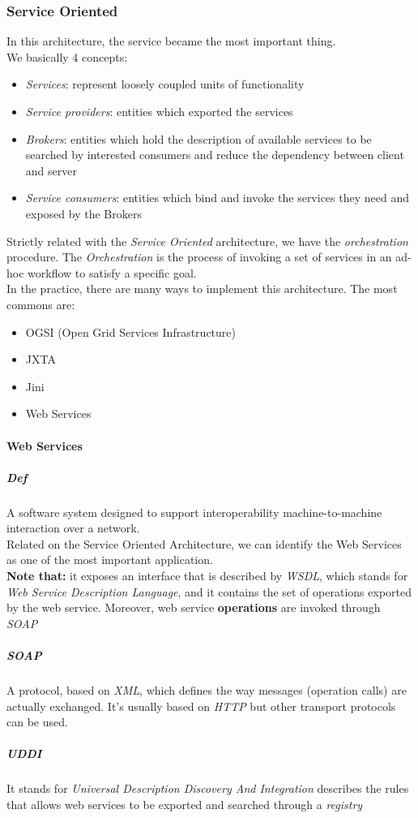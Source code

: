     \subsubsection{Service Oriented}
    In this architecture, the service became the most important thing.\\
    We basically 4 concepts:
    \begin{itemize}
        \item \textit{Services}: represent loosely coupled units of functionality
        \item \textit{Service providers}: entities which exported the services
        \item \textit{Brokers}: entities which hold the description of available 
                services to be searched by interested consumers and reduce the
                dependency between client and server
        \item \textit{Service consumers}: entities which bind and invoke the services
                they need and exposed by the Brokers
    \end{itemize}
    Strictly related with the \textit{Service Oriented} architecture, we have the \textit{orchestration} procedure. The \textit{Orchestration} is the process of invoking a set of services in an ad-hoc workflow to satisfy a specific goal.\\
    In the practice, there are many ways to implement this architecture.
    The most commons are:
    \begin{itemize}
        \item OGSI (Open Grid Services Infrastructure)
        \item JXTA
        \item Jini
        \item Web Services
    \end{itemize}
    
    \paragraph{Web Services}
    \subparagraph{Def}
    A software system designed to support interoperability machine-to-machine
    interaction over a network.\\
    
    Related on the Service Oriented Architecture, we can identify
    the Web Services as one of the most important application.\\
    
    \textbf{Note that:} it exposes an interface that is described by \textit{WSDL},
    which stands for \textit{Web Service Description Language}, and it
    contains the set of operations exported by the web service. Moreover, web service \textbf{operations} are invoked through \textit{SOAP}
    \subparagraph{SOAP}
    A protocol, based on \textit{XML}, which defines the way messages (operation calls) are actually exchanged. It's usually based on \textit{HTTP}
    but other transport protocols can be used.
    \subparagraph{UDDI}
    It stands for \textit{Universal Description Discovery And Integration} describes the rules that allows web services to be exported and searched through a \textit{registry}

